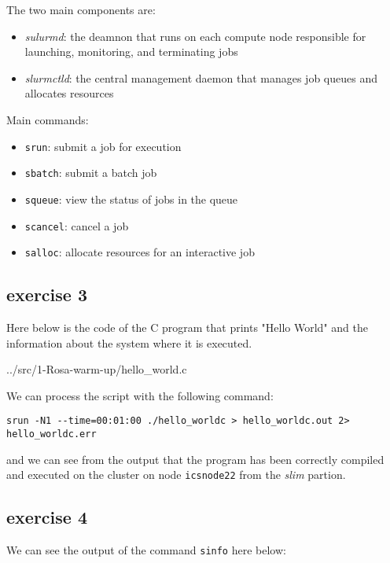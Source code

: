 \documentclass[unicode,11pt,a4paper,oneside,numbers=endperiod,openany]{scrartcl}
\begin{document}
The two main components are:
\begin{itemize}
    \item \textit{sulurmd}: the deamnon that runs on each compute node responsible for launching, monitoring, and terminating jobs
    \item \textit{slurmctld}: the central management daemon that manages job queues and allocates resources
\end{itemize}

Main commands:
\begin{itemize}
    \item \texttt{srun}: submit a job for execution
    \item \texttt{sbatch}: submit a batch job
    \item \texttt{squeue}: view the status of jobs in the queue
    \item \texttt{scancel}: cancel a job
    \item \texttt{salloc}: allocate resources for an interactive job
\end{itemize}

\subsection{exercise 3}
Here below is the code of the C program that prints "Hello World" and the information about the system where it is executed.

{../src/1-Rosa-warm-up/hello_world.c}

We can process the script with the following command:    
\begin{verbatim}
srun -N1 --time=00:01:00 ./hello_worldc > hello_worldc.out 2> hello_worldc.err
\end{verbatim}
and we can see from the output that the program has been correctly compiled and executed on the cluster on node \texttt{icsnode22} from the \textit{slim} partion.



\subsection{exercise 4}
We can see the output of the command \texttt{sinfo} here below: 

\end{document}
